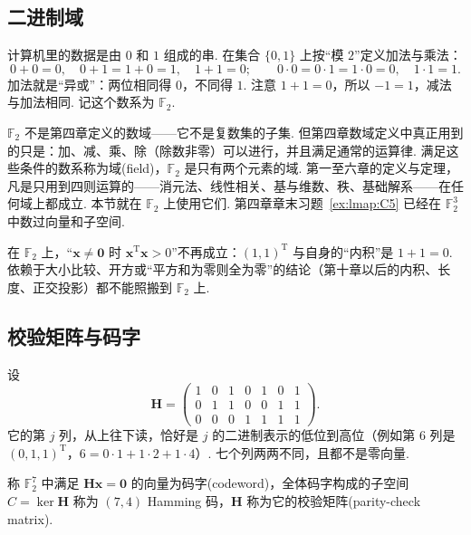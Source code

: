 \documentclass[lang=cn,10.5pt,scheme=chinese,toc=twocol,section,chinesefont=nofont,
twoside,citestyle=gb7714-2015,bibstyle=gb7714-2015]{elegantbook}
\DeclareRobustCommand{\textbf}[1]{{\lnsemiboldlatin\lnsemiboldcjk #1}}
\newcommand{\vv}[1]{\boldsymbol{#1}}
\newcommand{\zero}{\boldsymbol{0}}          %
\newcommand{\trans}{\mathrm{T}}             %
\numberwithin{equation}{section}   %
\begin{document}
\subsection{二进制域}

计算机里的数据是由 $0$ 和 $1$ 组成的串. 在集合 $\{0,1\}$ 上按“模 $2$”定义加法与乘法：
\[
  0+0=0,\quad 0+1=1+0=1,\quad 1+1=0;\qquad 0\cdot0=0\cdot1=1\cdot0=0,\quad 1\cdot1=1.
\]
加法就是“异或”：两位相同得 $0$，不同得 $1$. 注意 $1+1=0$，所以 $-1=1$，减法与加法相同. 记这个数系为 $\mathbb{F}_2$.

$\mathbb{F}_2$ 不是第四章定义的数域——它不是复数集的子集. 但第四章数域定义中真正用到的只是：加、减、乘、除（除数非零）可以进行，并且满足通常的运算律. 满足这些条件的数系称为\textbf{域}(field)，$\mathbb{F}_2$ 是只有两个元素的域. 第一至六章的定义与定理，凡是只用到四则运算的——消元法、线性相关、基与维数、秩、基础解系——在任何域上都成立. 本节就在 $\mathbb{F}_2$ 上使用它们. 第四章章末习题~\ref{ex:lmap:C5} 已经在 $\mathbb{F}_2^3$ 中数过向量和子空间.

\begin{pitfallbox}
  在 $\mathbb{F}_2$ 上，“$\vv x\neq\zero$ 时 $\vv x^\trans\vv x>0$”不再成立：$(1,1)^\trans$ 与自身的“内积”是 $1+1=0$. 依赖于大小比较、开方或“平方和为零则全为零”的结论（第十章以后的内积、长度、正交投影）都不能照搬到 $\mathbb{F}_2$ 上.
\end{pitfallbox}

\subsection{校验矩阵与码字}

设
\[
  \vv H=
  \begin{pmatrix}
    1 & 0 & 1 & 0 & 1 & 0 & 1 \\
    0 & 1 & 1 & 0 & 0 & 1 & 1 \\
    0 & 0 & 0 & 1 & 1 & 1 & 1
  \end{pmatrix}
  .
\]
它的第 $j$ 列，从上往下读，恰好是 $j$ 的二进制表示的低位到高位（例如第 $6$ 列是 $(0,1,1)^\trans$，$6=0\cdot1+1\cdot2+1\cdot4$）. 七个列两两不同，且都不是零向量.

\begin{definition}
  称 $\mathbb{F}_2^7$ 中满足 $\vv H\vv x=\zero$ 的向量为\textbf{码字}(codeword)，全体码字构成的子空间 $C=\ker\vv H$ 称为 $(7,4)$ \textbf{Hamming 码}，$\vv H$ 称为它的\textbf{校验矩阵}(parity-check matrix).
\end{definition}
\end{document}
